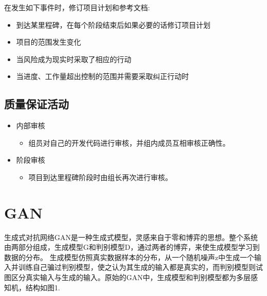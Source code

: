 \documentclass[hyperref, a4paper]{ctexart}
\providecommand{\tightlist}{%
  \setlength{\itemsep}{0pt}\setlength{\parskip}{0pt}}
\begin{document}
在发生如下事件时，修订项目计划和参考文档:

\begin{itemize}
\tightlist
\item
  到达某里程碑，在每个阶段结束后如果必要的话修订项目计划
\item
  项目的范围发生变化
\item
  当风险成为现实时采取了相应的行动
\item
  当进度、工作量超出控制的范围并需要采取纠正行动时
\end{itemize}

\hypertarget{ux8d28ux91cfux4fddux8bc1ux6d3bux52a8}{%
\subsection{质量保证活动}\label{ux8d28ux91cfux4fddux8bc1ux6d3bux52a8}}

\begin{itemize}
\tightlist
\item
  内部审核

  \begin{itemize}
  \tightlist
  \item
    组员对自己的开发代码进行审核，并组内成员互相审核正确性。
  \end{itemize}
\item
  阶段审核

  \begin{itemize}
  \tightlist
  \item
    项目到达里程碑阶段时由组长再次进行审核。
  \end{itemize}
\end{itemize}

\hypertarget{gan}{%
\section{GAN}\label{gan}}

生成式对抗网络GAN是一种生成式模型，灵感来自于零和博弈的思想。整个系统由两部分组成，生成模型G和判别模型D，通过两者的博弈，来使生成模型学习到数据的分布。
生成模型仿照真实数据样本的分布，从一个随机噪声z中生成一个输入并训练自己骗过判别模型，使之认为其生成的输入都是真实的，而判别模型则试图区分真实输入与生成的输入。原始的GAN中，生成模型和判别模型都为多层感知机，结构如图1.
\end{document}
